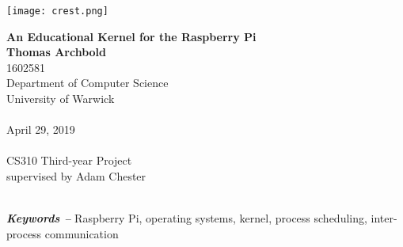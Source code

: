 \documentclass[10pt,a4paper]{article}
\providecommand{\keywords}[1]{\textbf{\textit{Keywords --}} #1}
\begin{document}
\begin{titlepage}
    \begin{center}

        \vspace*{2cm}
        \texttt{[image: crest.png]}

        \vspace*{1cm}
        {\Large \textbf{An Educational Kernel for the Raspberry Pi}} \\

        \vspace*{1cm}
        \textbf{Thomas Archbold} \\
        1602581 \\
        Department of Computer Science \\
        University of Warwick \\~\\

        April 29, 2019 \\~\\

        CS310 Third-year Project \\
        supervised by Adam Chester \\~\\

        \vfill

    \end{center}
\end{titlepage}



\keywords{Raspberry Pi, operating systems, kernel, process scheduling,
inter-process communication}

\pagebreak
\tableofcontents
\pagebreak











\end{document}
